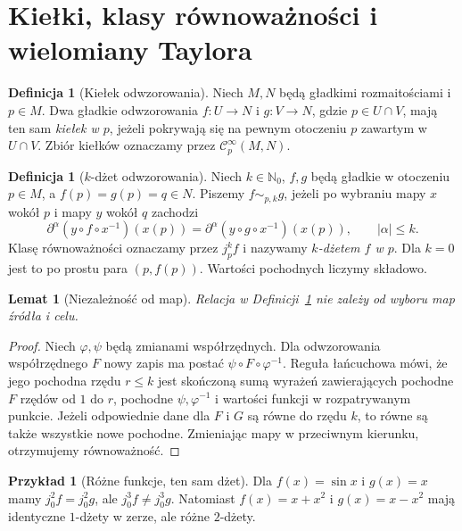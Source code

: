 \documentclass[11pt,a4paper,oneside]{book}
\numberwithin{equation}{chapter}
\theoremstyle{plain}
\newtheorem{lemat}[twierdzenie]{Lemat}
\theoremstyle{definition}
\newtheorem{definicja}[twierdzenie]{Definicja}
\newtheorem{przyklad}[twierdzenie]{Przykład}
\theoremstyle{remark}
\begin{document}
\section{Kiełki, klasy równoważności i wielomiany Taylora}
\begin{definicja}[Kiełek odwzorowania]
\label{def:dzety-kielek}
Niech $M,N$ będą gładkimi rozmaitościami i $p\in M$.
Dwa gładkie odwzorowania $f:U\to N$ i $g:V\to N$,
gdzie $p\in U\cap V$, mają ten sam \emph{kiełek w $p$},
jeżeli pokrywają się na pewnym otoczeniu $p$ zawartym w $U\cap V$.
Zbiór kiełków oznaczamy przez $\mathcal C^\infty_p(M,N)$.
\end{definicja}

\begin{definicja}[$k$-dżet odwzorowania]
\label{def:dzety-klasa}
Niech $k\in\mathbb N_0$, $f,g$ będą gładkie w otoczeniu $p\in M$,
a $f(p)=g(p)=q\in N$. Piszemy $f\sim_{p,k}g$, jeżeli
po wybraniu mapy $x$ wokół $p$ i mapy $y$ wokół $q$ zachodzi
\[
 \partial^\alpha (y\circ f\circ x^{-1})(x(p))
 =\partial^\alpha (y\circ g\circ x^{-1})(x(p)),
 \qquad |\alpha|\le k.
\]
Klasę równoważności oznaczamy przez $j_p^k f$ i nazywamy
\emph{$k$-dżetem $f$ w $p$}. Dla $k=0$ jest to po prostu para
$(p,f(p))$. Wartości pochodnych liczymy składowo.
\end{definicja}

\begin{lemat}[Niezależność od map]
\label{lem:dzety-mapy}
Relacja w Definicji~\ref{def:dzety-klasa} nie zależy od wyboru
map źródła i celu.
\end{lemat}
\begin{proof}
Niech $\varphi,\psi$ będą zmianami współrzędnych.
Dla odwzorowania współrzędnego $F$ nowy zapis ma postać
$\psi\circ F\circ\varphi^{-1}$. Reguła łańcuchowa mówi,
że jego pochodna rzędu $r\le k$ jest skończoną sumą wyrażeń
zawierających pochodne $F$ rzędów od $1$ do $r$, pochodne
$\psi,\varphi^{-1}$ i wartości funkcji w rozpatrywanym punkcie.
Jeżeli odpowiednie dane dla $F$ i $G$ są równe do rzędu $k$,
to równe są także wszystkie nowe pochodne. Zmieniając mapy
w przeciwnym kierunku, otrzymujemy równoważność.
\end{proof}

\begin{przyklad}[Różne funkcje, ten sam dżet]
\label{ex:dzety-taylor}
Dla $f(x)=\sin x$ i $g(x)=x$ mamy $j_0^2f=j_0^2g$,
ale $j_0^3f\ne j_0^3g$. Natomiast $f(x)=x+x^2$
i $g(x)=x-x^2$ mają identyczne $1$-dżety w zerze,
ale różne $2$-dżety.
\end{przyklad}
\end{document}
